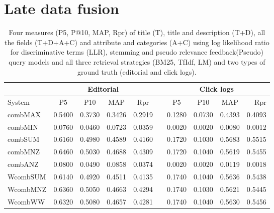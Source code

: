 \section{Late data fusion}

\begin{table}[H]
\begin{center}
\scriptsize
\caption{
Four measures (P\@5, P@10, MAP, Rpr) of title (T), title and description (T+D), all the fields (T+D+A+C) and attribute and categories (A+C) using log likelihood ratio for discriminative terms (LLR), stemming and pseudo relevance feedback(Pseudo) query models and all three retrieval strategies (BM25, TfIdf, LM) and two types of ground truth (editorial and click logs).}
\label{table:ldf}

\begin{tabular}{lccccccccr}
\toprule
 & \multicolumn{4}{c}{Editorial} & & \multicolumn{4}{c}{Click logs} \\
\midrule
System & P\@5 & P\@10 & MAP & Rpr &   & P\@5 & P\@10 & MAP & Rpr \\
\midrule
	combMAX & 0.5400 & 0.3730 & 0.3426 & 0.2919 &   & 0.1280 & 0.0730 & 0.4393 & 0.4093 \\
	combMIN & 0.0760 & 0.0460 & 0.0723 & 0.0359 &   & 0.0020 & 0.0020 & 0.0080 & 0.0012 \\
	combSUM & 0.6160 & 0.4980 & 0.4589 & 0.4160 &   & 0.1720 & 0.1030 & 0.5683 & 0.5515 \\
	combMNZ & 0.6460 & 0.5030 & 0.4688 & 0.4309 &   & 0.1720 & 0.1040 & 0.5619 & 0.5455 \\
	combANZ & 0.0800 & 0.0490 & 0.0858 & 0.0374 &   & 0.0020 & 0.0020 & 0.0119 & 0.0018 \\
	WcombSUM & 0.6140 & 0.4920 & 0.4511 & 0.4135 &   & 0.1740 & 0.1040 & 0.5636 & 0.5438 \\
	WcombMNZ & 0.6360 & 0.5050 & 0.4663 & 0.4294 &   & 0.1740 & 0.1030 & 0.5621 & 0.5445 \\
	WcombWW & 0.6320 & 0.5080 & 0.4657 & 0.4281 &   & 0.1740 & 0.1040 & 0.5630 & 0.5456 \\
\bottomrule
\end{tabular}
\end{center}
\end{table}


